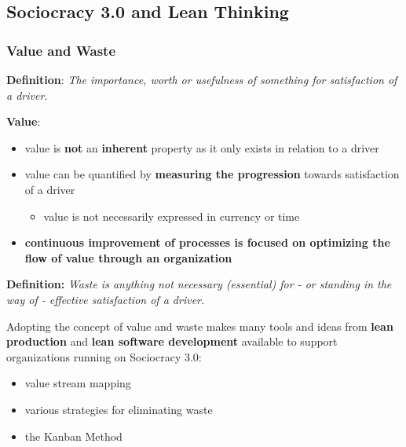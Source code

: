\subsection{Sociocracy 3.0 and Lean Thinking}
\label{sociocracy3.0andleanthinking}

\subsubsection{Value and Waste}
\label{valueandwaste}

\textbf{Definition}: \emph{The importance, worth or usefulness of something for satisfaction of a driver.}

\textbf{Value}:

\begin{itemize}
\item value is \textbf{not} an \textbf{inherent} property as it only exists in relation to a driver

\item value can be quantified by \textbf{measuring the progression} towards satisfaction of a driver

\begin{itemize}
\item value is not necessarily expressed in currency or time

\end{itemize}

\item \textbf{continuous improvement of processes is focused on optimizing the flow of value through an organization}

\end{itemize}

\textbf{Definition:} \emph{Waste is anything not necessary (essential) for - or standing in the way of - effective satisfaction of a driver.}

Adopting the concept of value and waste makes many tools and ideas from \textbf{lean production} and \textbf{lean software development} available to support organizations running on Sociocracy 3.0:

\begin{itemize}
\item value stream mapping

\item various strategies for eliminating waste

\item the Kanban Method

\end{itemize}

